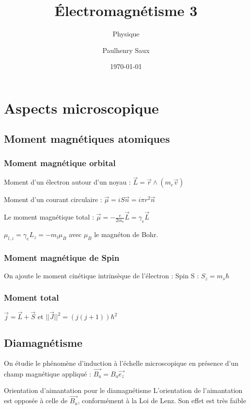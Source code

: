\documentclass[french]{yLectureNote}
\title{Électromagnétisme 3}
\subtitle{Physique}
\author{Paulhenry Saux}
\date{\today}
\renewcommand{\vec}{\overrightarrow}
\newcommand{\norm}[1]{||\vec{#1}||}
\begin{document}
\setcounter{chapter}{5}
\chapter{Aspects microscopique}
\section{Moment magnétiques atomiques}
\subsection{Moment magnétique orbital}
\begin{definition}
    Moment d'un électron autour d'un noyau : $\vec{L} = \vec{r}\wedge (m_e \vec{v})$

    Moment d'un courant circulaire : $\vec{\mu} = iS\vec{n} = i\pi r^2\vec{n}$

    Le moment magnétique total : $\vec{\mu} = -\frac{e}{2m_e}\vec{L} = \gamma_e \vec{L}$
\end{definition}
\begin{definition}
    $\mu_{l,z} =\gamma_e L_z =  -m_l \mu_B$ avec $\mu_B$ le magnéton de Bohr.
\end{definition}
\subsection{Moment magnétique de Spin}
On ajoute le moment cinétique intrinsèque de l'électron : Spin S : $S_z = m_s \hbar$
\subsection{Moment total}
$\vec{j} = \vec{L} + \vec{S}$ et $\norm{J}^2 = (j(j+1))\hbar^2$
\section{Diamagnétisme}
On étudie le phénomène d'induction à l'échelle microscopique en présence d'un champ magnétique appliqué : $\vec{B_a} = B_a \vec{e_z}$
\begin{theorem}{Orientation d'aimantation pour le diamagnétisme}
    L'orientation de l'aimantation est opposée à celle de $\vec{B_a}$, conformément à la Loi de Lenz. Son effet est très faible
\end{theorem}
\end{document}
